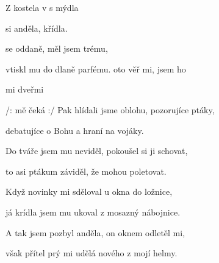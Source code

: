 

\zs
Z  kostela
v  s  mýdla

  si anděla,
  křídla. 

 se  oddaně,
 měl jsem  trému,

 vtiskl  mu do dlaně 
  parfému. 
\ks
\zr
{}oto  věř mi,
 jsem ho 

 mi  dveřmi
 

/:  mě čeká   :/
\kr
\zs
Pak hlídali jsme oblohu, pozorujíce ptáky,

debatujíce o Bohu a hraní na vojáky.

Do tváře jsem mu neviděl, pokoušel si ji schovat,

to asi ptákum záviděl, že mohou poletovat.
\ks

\zr
\kr

\zs
Když novinky mi sděloval u okna do ložnice,

já krídla jsem mu ukoval z mosazný nábojnice.

A tak jsem pozbyl anděla, on oknem odletěl mi,

však přítel prý mi udělá nového z mojí helmy.
\ks

\zr
\kr
\kp
